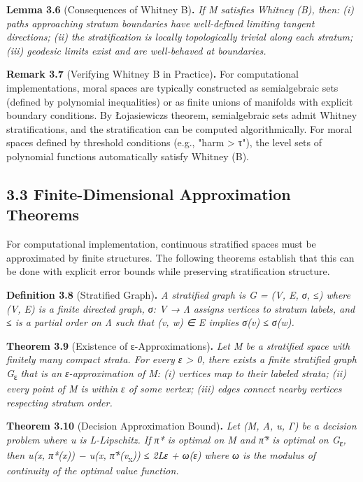 \documentclass[12pt]{article}
\theoremstyle{plain}
\theoremstyle{definition}
\theoremstyle{remark}
\begin{document}
\textbf{Lemma 3.6} (Consequences of Whitney B)\textbf{.} \emph{If M
satisfies Whitney (B), then: (i) paths approaching stratum boundaries
have well-defined limiting tangent directions; (ii) the stratification
is locally topologically trivial along each stratum; (iii) geodesic
limits exist and are well-behaved at boundaries.}

\textbf{Remark 3.7} (Verifying Whitney B in Practice)\textbf{.} For
computational implementations, moral spaces are typically constructed as
semialgebraic sets (defined by polynomial inequalities) or as finite
unions of manifolds with explicit boundary conditions. By
Łojasiewicz\textquotesingle s theorem, semialgebraic sets admit Whitney
stratifications, and the stratification can be computed algorithmically.
For moral spaces defined by threshold conditions (e.g., "harm
\textgreater{} τ"), the level sets of polynomial functions automatically
satisfy Whitney (B).

\subsection{3.3 Finite-Dimensional Approximation
Theorems}\label{finite-dimensional-approximation-theorems}

For computational implementation, continuous stratified spaces must be
approximated by finite structures. The following theorems establish that
this can be done with explicit error bounds while preserving
stratification structure.

\textbf{Definition 3.8} (Stratified Graph)\textbf{.} \emph{A stratified
graph is G = (V, E, σ, ≤) where (V, E) is a finite directed graph, σ: V
→ Λ assigns vertices to stratum labels, and ≤ is a partial order on Λ
such that (v, w) ∈ E implies σ(v) ≤ σ(w).}

\textbf{Theorem 3.9} (Existence of ε-Approximations)\textbf{.} \emph{Let
M be a stratified space with finitely many compact strata. For every ε
\textgreater{} 0, there exists a finite stratified graph
G}\textsubscript{ε} \emph{that is an ε-approximation of M: (i) vertices
map to their labeled strata; (ii) every point of M is within ε of some
vertex; (iii) edges connect nearby vertices respecting stratum order.}

\textbf{Theorem 3.10} (Decision Approximation Bound)\textbf{.} \emph{Let
(M, A, u, Γ) be a decision problem where u is L-Lipschitz. If π* is
optimal on M and π̂* is optimal on G}\textsubscript{ε}\emph{, then
\textbar u(x, π*(x)) − u(x, π̂*(v}\textsubscript{x}\emph{))\textbar{} ≤
2Lε + ω(ε) where ω is the modulus of continuity of the optimal value
function.}
\end{document}
